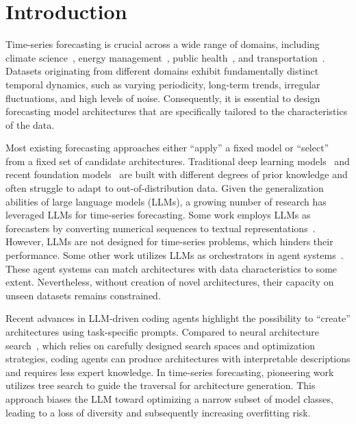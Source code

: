 \section{Introduction}

Time-series forecasting is crucial across a wide range of domains, including climate science~\cite{tsf_example_1,tsf_example_2}, energy management~\cite{tsf_example_3,tsf_example_4}, public health~\cite{tsf_example_5,tsf_example_6}, and transportation~\cite{tsf_example_7}. Datasets originating from different domains exhibit fundamentally distinct temporal dynamics, such as varying periodicity, long-term trends, irregular fluctuations, and high levels of noise. Consequently, it is essential to design forecasting model architectures that are specifically tailored to the characteristics of the data.

Most existing forecasting approaches either ``apply'' a fixed model or ``select'' from a fixed set of candidate architectures. Traditional deep learning models~\cite{DLinear,SparseTSF,PatchTST} and recent foundation models~\cite{Sundial,TimesFM,Moirai} are built with different degrees of prior knowledge and often struggle to adapt to out-of-distribution data. Given the generalization abilities of large language models (LLMs), a growing number of research has leveraged LLMs for time-series forecasting. Some work employs LLMs as forecasters by converting numerical sequences to textual representations~\cite{LLM_forecaster,GPT4MTS,TimeLLM,AutoTimes}. However, LLMs are not designed for time-series problems, which hinders their performance. Some other work utilizes LLMs as orchestrators in agent systems~\cite{TimeSeriesScientist,TimeCopilot}. These agent systems can match architectures with data characteristics to some extent. Nevertheless, without creation of novel architectures, their capacity on unseen datasets remains constrained.

Recent advances in LLM-driven coding agents highlight the possibility to ``create'' architectures using task-specific prompts. Compared to neural architecture search~\cite{nas_survey}, which relies on carefully designed search spaces and optimization strategies, coding agents can produce architectures with interpretable descriptions and requires less expert knowledge. In time-series forecasting, pioneering work~\cite{SEA-TS} utilizes tree search to guide the traversal for architecture generation. This approach biases the LLM toward optimizing a narrow subset of model classes, leading to a loss of diversity and subsequently increasing overfitting risk.

